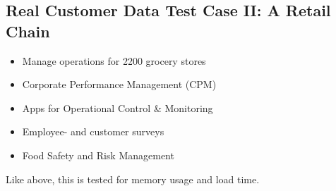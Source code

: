 \subsection{Real Customer Data Test Case II: A Retail Chain}
\label{sub:Real Customer Data Test Case II: A Retail Chain}
\begin{itemize}
    \item Manage operations for 2200 grocery stores
    \item Corporate Performance Management (CPM)
    \item Apps for Operational Control \& Monitoring
    \item Employee- and customer surveys
    \item Food Safety and Risk Management
\end{itemize}
Like above, this is tested for memory usage and load time.



